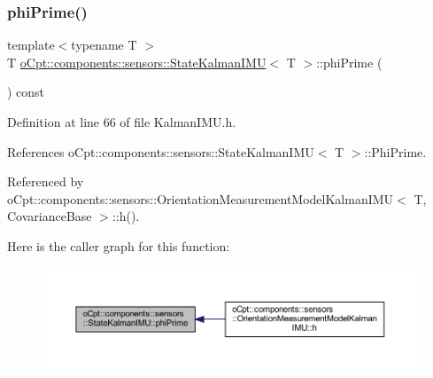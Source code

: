 \subsubsection{\texorpdfstring{phi\+Prime()}{phiPrime()}\hspace{0.1cm}{\footnotesize\ttfamily [1/2]}}
{\footnotesize\ttfamily template$<$typename T $>$ \\
T \hyperlink{classo_cpt_1_1components_1_1sensors_1_1_state_kalman_i_m_u}{o\+Cpt\+::components\+::sensors\+::\+State\+Kalman\+I\+MU}$<$ T $>$\+::phi\+Prime (\begin{DoxyParamCaption}{ }\end{DoxyParamCaption}) const\hspace{0.3cm}{\ttfamily [inline]}}



Definition at line 66 of file Kalman\+I\+M\+U.\+h.



References o\+Cpt\+::components\+::sensors\+::\+State\+Kalman\+I\+M\+U$<$ T $>$\+::\+Phi\+Prime.



Referenced by o\+Cpt\+::components\+::sensors\+::\+Orientation\+Measurement\+Model\+Kalman\+I\+M\+U$<$ T, Covariance\+Base $>$\+::h().

Here is the caller graph for this function\+:
\nopagebreak
\begin{figure}[H]
\begin{center}
\leavevmode
\includegraphics[width=350pt]{classo_cpt_1_1components_1_1sensors_1_1_state_kalman_i_m_u_ac98769f4896ac5b4f82e7cbf5ec153b4_icgraph}
\end{center}
\end{figure}
\hypertarget{classo_cpt_1_1components_1_1sensors_1_1_state_kalman_i_m_u_a647260f2a1427ac4f540355358c88828}{}\label{classo_cpt_1_1components_1_1sensors_1_1_state_kalman_i_m_u_a647260f2a1427ac4f540355358c88828} 

